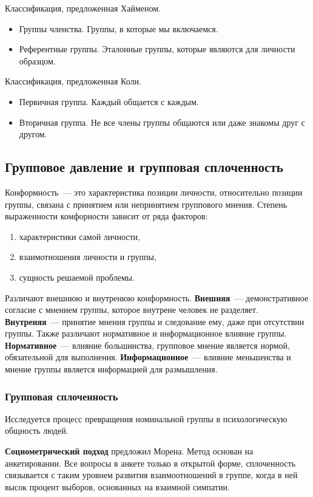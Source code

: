 Классификация, предложенная Хайменом.
\begin{itemize}
	\item Группы членства. Группы, в которые мы включаемся.
	\item Референтные группы. Эталонные группы, которые являются для личности образцом.
\end{itemize}

Классификация, предложенная Коли.
\begin{itemize}
	\item Первичная группа. Каждый общается с каждым.
	\item Вторичная группа. Не все члены группы общаются или даже знакомы друг с другом.
\end{itemize}

\subsection{Групповое давление и групповая сплоченность}
Конформность~--- это характеристика позиции личности, относительно позиции группы, связана с принятием или непринятием группового мнения. Степень выраженности комфорности зависит от ряда факторов:
\begin{enumerate}
	\item характеристики самой личности,
	\item взаимотношения личности и группы,
	\item сущность решаемой проблемы.
\end{enumerate}
Различают внешнюю и внутренюю конформность. \textbf{Внешняя}~--- демонстративное согласие с мнением группы, которое внутрене человек не разделяет. \textbf{Внутреняя}~--- принятие мнения группы и следование ему, даже при отсутствии группы. Также различают нормативное и информационное влияние группы. \textbf{Нормативное}~--- влияние большинства, групповое мнение является нормой, обязательной для выполнения. \textbf{Информационное}~--- влияние меньшенства и мнение группы является информацией для размышления.

\subsubsection{Групповая сплоченность}
Исследуется процесс превращения номинальной группы в психологическую общность людей.

\textbf{Социометрический подход} предложил Морена. Метод основан на анкетировании. Все вопросы в анкете только в открытой форме, сплоченность связывается с таким уровнем развития взаимоотношений в группе, когда в ней высок процент выборов, основанных на взаимной симпатии.

